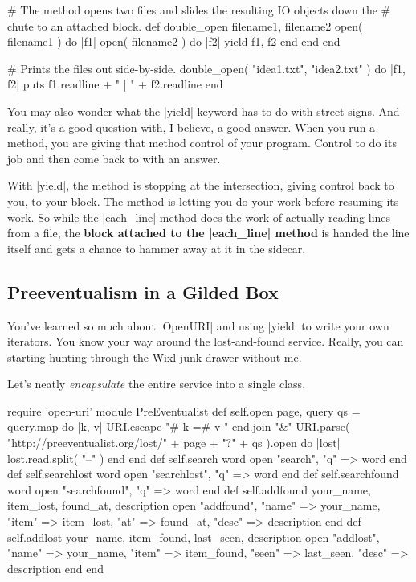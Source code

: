 \documentclass[12pt,twoside]{report}
\begin{document}
\begin{rubycode}

 # The method opens two files and slides the resulting IO objects down the
 # chute to an attached block.
 def double_open filename1, filename2
   open( filename1 ) do |f1|
     open( filename2 ) do |f2|
       yield f1, f2
     end
   end
 end

 # Prints the files out side-by-side.
 double_open( "idea1.txt", "idea2.txt" ) do |f1, f2|
   puts f1.readline + " | " + f2.readline
 end

\end{rubycode}


You may also wonder what the \rubyinline|yield|
keyword has to do with street signs.  And really, it's a good question
with, I believe, a good answer.  When you run a method, you are giving
that method control of your program.  Control to do its job and then
come back to with an answer.

With \rubyinline|yield|, the method is stopping at the
intersection, giving control back to you, to your block.  The method
is letting you do your work before resuming its work.  So while the
\rubyinline|each_line| method does the work of
actually reading lines from a file, the {\bf block attached to the
  \rubyinline|each_line| method} is handed the line
itself and gets a chance to hammer away at it in the sidecar.



\subsection{Preeventualism in a Gilded Box}



You've learned so much about \rubyinline|OpenURI| and
using \rubyinline|yield| to write your own
iterators. You know your way around the lost-and-found service.
Really, you can starting hunting through the Wixl junk drawer without
me.

Let's neatly {\em encapsulate} the entire service into a single class.


\begin{rubycode}

 require 'open-uri'
 module PreEventualist
   def self.open page, query
     qs =
       query.map do |k, v|
         URI.escape "#{ k }=#{ v }"
       end.join "&"
     URI.parse( "http://preeventualist.org/lost/" + page + "?" + qs ).open do |lost|
       lost.read.split( "--\n" )
     end
   end
   def self.search word
     open "search", "q" => word
   end
   def self.searchlost word
     open "searchlost", "q" => word
   end
   def self.searchfound word
     open "searchfound", "q" => word
   end
   def self.addfound your_name, item_lost, found_at, description
     open "addfound", "name" => your_name, "item" => item_lost,
                      "at" => found_at, "desc" => description
   end
   def self.addlost your_name, item_found, last_seen, description
     open "addlost", "name" => your_name, "item" => item_found,
                     "seen" => last_seen, "desc" => description
   end
 end

\end{rubycode}
\end{document}
